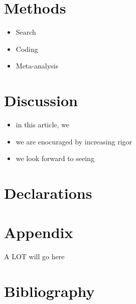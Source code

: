 \documentclass[sn-nature,pdflatex]{sn-jnl}
\providecommand{\tightlist}{%
  \setlength{\itemsep}{0pt}\setlength{\parskip}{0pt}}
\begin{document}
\section{Methods}\label{sec3}

\begin{itemize}
\tightlist
\item
  Search
\item
  Coding
\item
  Meta-analysis
\end{itemize}

\section{Discussion}\label{sec4}

\begin{itemize}
\tightlist
\item
  in this article, we
\item
  we are enocuraged by increasing rigor
\item
  we look forward to seeing
\end{itemize}

\backmatter



\section*{Declarations}\label{declarations}

\section{Appendix}\label{secA1}

A LOT will go here

\section{Bibliography}\label{bibliography}

\renewcommand\refname{References}

\end{document}
